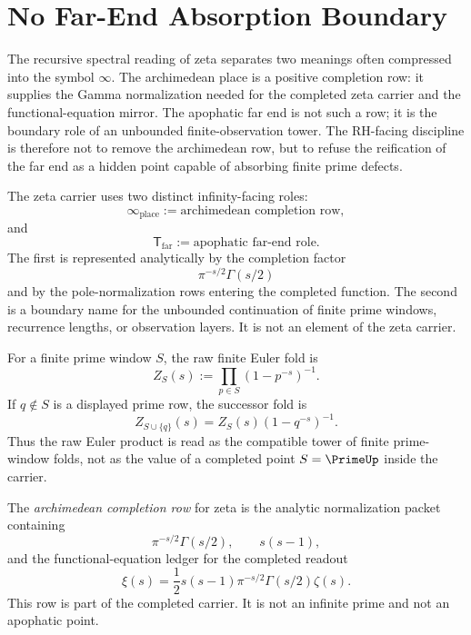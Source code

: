 \section{No Far-End Absorption Boundary}
\label{sec:unified-reality-no-far-end-absorption-boundary}

The recursive spectral reading of zeta separates two meanings often
compressed into the symbol $\infty$.  The archimedean place is a positive
completion row: it supplies the Gamma normalization needed for the
completed zeta carrier and the functional-equation mirror.  The
apophatic far end is not such a row; it is the boundary role of an
unbounded finite-observation tower.  The RH-facing discipline is
therefore not to remove the archimedean row, but to refuse the
reification of the far end as a hidden point capable of absorbing finite
prime defects.

\begin{definition}
\label{def:unified-reality-two-infinity-roles-zeta}
The zeta carrier uses two distinct infinity-facing roles:
$$
\infty_{\mathrm{place}}
:=
\text{archimedean completion row},
$$
and
$$
\mathsf{T}_{\mathrm{far}}
:=
\text{apophatic far-end role}.
$$
The first is represented analytically by the completion factor
$$
\pi^{-s/2}\Gamma(s/2)
$$
and by the pole-normalization rows entering the completed function.  The
second is a boundary name for the unbounded continuation of finite prime
windows, recurrence lengths, or observation layers.  It is not an
element of the zeta carrier.
\end{definition}

\begin{definition}
\label{def:unified-reality-finite-prime-window-recursive-fold}
For a finite prime window $S$, the raw finite Euler fold is
$$
Z_S(s)
:=
\prod_{p\in S}(1-p^{-s})^{-1}.
$$
If $q\notin S$ is a displayed prime row, the successor fold is
$$
Z_{S\cup\{q\}}(s)
=
Z_S(s)(1-q^{-s})^{-1}.
$$
Thus the raw Euler product is read as the compatible tower of finite
prime-window folds, not as the value of a completed point
$S=\PrimeUp$ inside the carrier.
\end{definition}

\begin{definition}
\label{def:unified-reality-archimedean-completion-row}
The \emph{archimedean completion row} for zeta is the analytic
normalization packet containing
$$
\pi^{-s/2}\Gamma(s/2),
\qquad
s(s-1),
$$
and the functional-equation ledger for the completed readout
$$
\xi(s)
=
\frac12s(s-1)\pi^{-s/2}\Gamma(s/2)\zeta(s).
$$
This row is part of the completed carrier.  It is not an infinite prime
and not an apophatic point.
\end{definition}

